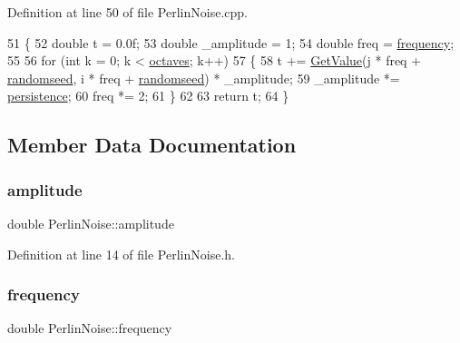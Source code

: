 Definition at line 50 of file Perlin\+Noise.\+cpp.


\begin{DoxyCode}
51 \{
52     \textcolor{keywordtype}{double} t = 0.0f;
53     \textcolor{keywordtype}{double} \_amplitude = 1;
54     \textcolor{keywordtype}{double} freq = \mbox{\hyperlink{class_perlin_noise_a5e0b39e0cf38d292f0c92a428ecc56fc}{frequency}};
55 
56     \textcolor{keywordflow}{for} (\textcolor{keywordtype}{int} k = 0; k < \mbox{\hyperlink{class_perlin_noise_a1098ffa60dc53802b509e57e6d96c072}{octaves}}; k++)
57     \{
58         t += \mbox{\hyperlink{class_perlin_noise_aa62e61ba1a73bdeff0901e95f656a806}{GetValue}}(j * freq + \mbox{\hyperlink{class_perlin_noise_a012846debd95e4cc158600fa381810d9}{randomseed}}, i * freq + 
      \mbox{\hyperlink{class_perlin_noise_a012846debd95e4cc158600fa381810d9}{randomseed}}) * \_amplitude;
59         \_amplitude *= \mbox{\hyperlink{class_perlin_noise_aeb01e2c26e1b3c87fcbe1a1e0bc28881}{persistence}};
60         freq *= 2;
61     \}
62 
63     \textcolor{keywordflow}{return} t;
64 \}
\end{DoxyCode}


\subsection{Member Data Documentation}
\mbox{\label{class_perlin_noise_a61323596df1daa4a56f057a43f9c12ba}} 
\subsubsection{\texorpdfstring{amplitude}{amplitude}}
{\footnotesize\ttfamily double Perlin\+Noise\+::amplitude\hspace{0.3cm}{\ttfamily [private]}}



Definition at line 14 of file Perlin\+Noise.\+h.

\mbox{\label{class_perlin_noise_a5e0b39e0cf38d292f0c92a428ecc56fc}} 
\subsubsection{\texorpdfstring{frequency}{frequency}}
{\footnotesize\ttfamily double Perlin\+Noise\+::frequency\hspace{0.3cm}{\ttfamily [private]}}



